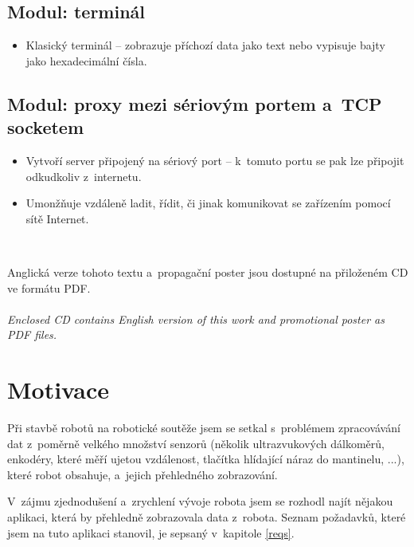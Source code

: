 \documentclass[12pt, a4paper, oneside]{article}
\newcommand{\It}{\textit}  %
\begin{document}
\subsection*{Modul: terminál}
\begin{itemize}
    \item Klasický terminál -- zobrazuje příchozí data jako text nebo vypisuje bajty jako hexadecimální čísla.
\end{itemize}

\subsection*{Modul: proxy mezi sériovým portem a~TCP socketem}
\begin{itemize}
    \item Vytvoří server připojený na sériový port -- k~tomuto portu se pak lze připojit odkudkoliv z~internetu.
    \item Umonžňuje vzdáleně ladit, řídit, či jinak komunikovat se zařízením pomocí sítě Internet.
\end{itemize}
~
\vspace{7mm}

\noindent Anglická verze tohoto textu a~propagační poster jsou dostupné na přiloženém CD ve formátu PDF.\\
\\
\noindent\It{Enclosed CD contains English version of this work and promotional poster as PDF files.}

\section{Motivace}
\label{motivace}
Při stavbě robotů na robotické soutěže jsem se setkal s~problémem zpracovávání dat z~poměrně velkého množství senzorů (několik ultrazvukových dálkoměrů, enkodéry, které měří ujetou vzdálenost, tlačítka hlídající náraz do mantinelu, ...), které robot obsahuje, a~jejich přehledného zobrazování. 

V~zájmu zjednodušení a~zrychlení vývoje robota jsem se rozhodl najít nějakou aplikaci, která by přehledně zobrazovala data z~robota. Seznam požadavků, které jsem na tuto aplikaci stanovil, je sepsaný v~kapitole \ref{reqs}.
\end{document}
